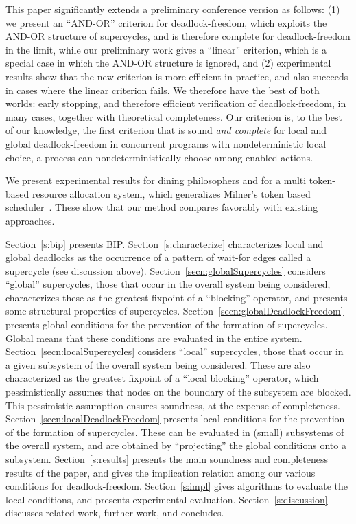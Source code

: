 This paper significantly extends a preliminary conference version \cite{FORTE13} as
follows: 
(1) we present an ``AND-OR'' criterion for deadlock-freedom, which exploits the AND-OR structure of supercycles, and is therefore complete for
deadlock-freedom in the limit, while our preliminary work \cite{FORTE13} gives a ``linear'' criterion, which is a special case in which the AND-OR structure is ignored, and
(2) experimental results show that the new criterion is more efficient
in practice, and also succeeds in cases where the linear criterion
fails.
We therefore have the best of both worlds: early stopping, and
therefore efficient verification of deadlock-freedom, in many cases,
together with theoretical completeness.
%
Our criterion is, to the best of our knowledge, the first criterion that is sound \emph{and complete} for local and global deadlock-freedom in
concurrent programs with nondeterministic local choice, \ie a process can nondeterministically choose among enabled actions.

We present experimental results for dining philosophers and for a multi token-based resource allocation system, which generalizes Milner's token based
scheduler~\cite{milner}.  These show that our method compares favorably with existing approaches.



Section~\ref{s:bip} presents BIP.  Section~\ref{s:characterize} characterizes local and global deadlocks as the occurrence of a pattern of wait-for
edges called a supercycle (see discussion above).   Section~\ref{secn:globalSupercycles} considers ``global''
supercycles, \ie those that occur in the overall system being considered, characterizes these as the greatest fixpoint of a ``blocking'' operator, and
presents some structural properties of supercycles. Section~\ref{secn:globalDeadlockFreedom} presents global conditions for the prevention of the
formation of supercycles. Global means that these conditions are evaluated in the entire system.  Section~\ref{secn:localSupercycles} considers
``local'' supercycles, \ie those that occur in a given subsystem of the overall system being considered.  These are also characterized as the greatest
fixpoint of a ``local blocking'' operator, which pessimistically assumes that nodes on the boundary of the subsystem are blocked. This pessimistic
assumption ensures soundness, at the expense of completeness.  Section~\ref{secn:localDeadlockFreedom} presents local conditions for the prevention of
the formation of supercycles. These can be evaluated in (small) subsystems of the overall system, and are obtained by ``projecting'' the global
conditions onto a subsystem.  Section~\ref{s:results} presents the main soundness and completeness results of the paper, and gives the implication
relation among our various conditions for deadlock-freedom.  Section~\ref{s:impl} gives algorithms to evaluate the local conditions, and presents
experimental evaluation.  Section~\ref{s:discussion} discusses related work, further work, and concludes.
